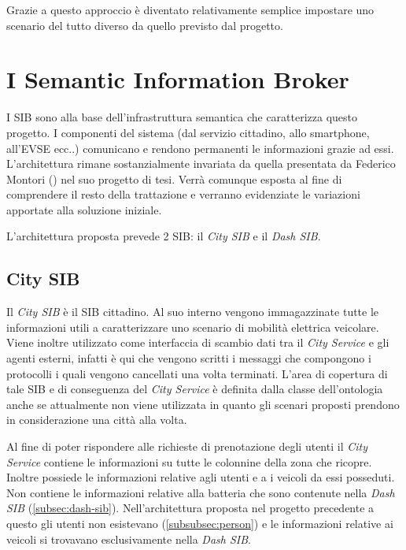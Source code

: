 Grazie a questo approccio è diventato relativamente semplice impostare uno scenario del tutto diverso da quello previsto dal progetto.

\section{I Semantic Information Broker}

I SIB sono alla base dell'infrastruttura semantica che caratterizza questo progetto. I componenti del sistema (dal servizio cittadino, allo smartphone, all'EVSE ecc..) comunicano e rendono permanenti le informazioni grazie ad essi. L'architettura rimane sostanzialmente invariata da quella presentata da Federico Montori (\cite{montori2012}) nel suo progetto di tesi. Verrà comunque esposta al fine di comprendere il resto della trattazione e verranno evidenziate le variazioni apportate alla soluzione iniziale.

L'architettura proposta prevede 2 SIB: il \emph{City SIB} e il \emph{Dash SIB}.

\subsection{City SIB}\label{subsec:city-sib}

Il \emph{City SIB} è il SIB cittadino. Al suo interno vengono immagazzinate tutte le informazioni utili a caratterizzare uno scenario di mobilità elettrica veicolare. Viene inoltre utilizzato come interfaccia di scambio dati tra il \emph{City Service} e gli agenti esterni, infatti è qui che vengono scritti i messaggi che compongono i protocolli i quali vengono cancellati una volta terminati. L'area di copertura di tale SIB e di conseguenza del \emph{City Service} è definita dalla classe dell'ontologia  anche se attualmente non viene utilizzata in quanto gli scenari proposti prendono in considerazione una città alla volta.

Al fine di poter rispondere alle richieste di prenotazione degli utenti il \emph{City Service} contiene le informazioni su tutte le colonnine della zona che ricopre. Inoltre possiede le informazioni relative agli utenti e a i veicoli da essi posseduti. Non contiene le informazioni relative alla batteria che sono contenute nella \emph{Dash SIB} (\ref{subsec:dash-sib}). Nell'architettura proposta nel progetto precedente a questo gli utenti non esistevano (\ref{subsubsec:person}) e le informazioni relative ai veicoli si trovavano esclusivamente nella \emph{Dash SIB}.

